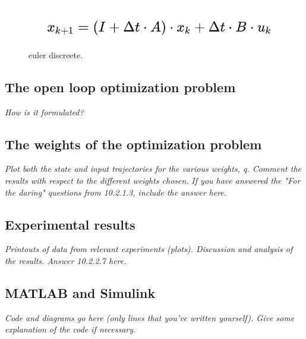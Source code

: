 \begin{figure}[h]
    \centering
    \includegraphics[width=0.6\linewidth]{Rapport/figures/Screenshot 2024-02-20 at 14.17.21.jpg}
    \caption{euler discreete.}
    \label{fig:enter-label}
\end{figure}

\subsection{The open loop optimization problem}
\textit{How is it formulated?}

\subsection{The weights of the optimization problem}
\textit{Plot both the state and input trajectories for the various weights, q. Comment the results with respect to the different weights chosen.}
\textit{If you have answered the "For the daring" questions from 10.2.1.3, include the answer here.}

\subsection{Experimental results}
\textit{Printouts of data from relevant experiments (plots).
Discussion and analysis of the results.
Answer 10.2.2.7 here.}

\subsection{MATLAB and Simulink}
\textit{Code and diagrams go here (only lines that you've written yourself). Give some explanation of the code if necessary.}
	
	
	
	
	
	
	
	
	
	
	
	
	 
	
